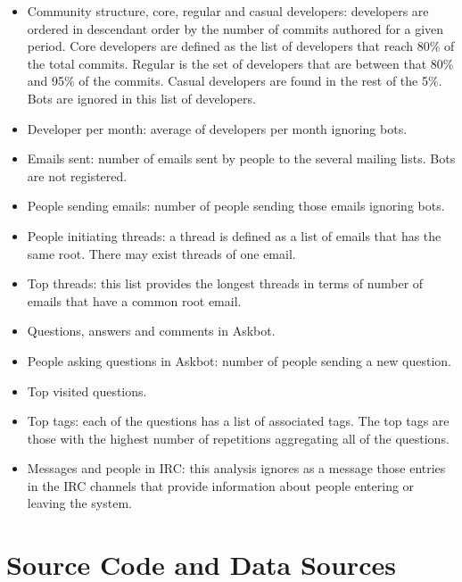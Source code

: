 \documentclass[a4wide,11pt]{report}
\begin{document}
\begin{itemize}
\item Community structure, core, regular and casual developers: developers are ordered in descendant order by the
number of commits authored for a given period. Core developers are defined as the list of developers that 
reach 80\% of the total commits. Regular is the set of developers that are between that 80\% and 95\% of the commits.
Casual developers are found in the rest of the 5\%. Bots are ignored in this list of developers.

\item Developer per month: average of developers per month ignoring bots.

\item Emails sent: number of emails sent by people to the several mailing lists. Bots are not registered.

\item People sending emails: number of people sending those emails ignoring bots.

\item People initiating threads: a thread is defined as a list of emails that has the same root. There may exist
threads of one email.

\item Top threads: this list provides the longest threads in terms of number of emails that have a common root email.

\item Questions, answers and comments in Askbot.

\item People asking questions in Askbot: number of people sending a new question.

\item Top visited questions.

\item Top tags: each of the questions has a list of associated tags. The top tags  are those 
with the highest number of repetitions aggregating all of the questions.

\item Messages and people in IRC: this analysis ignores as a message those entries in the IRC channels that provide
information about people entering or leaving the system.  

\end{itemize}



\chapter{Source Code and Data Sources}
\label{chap:data_sources}
\end{document}
